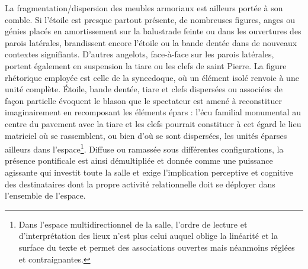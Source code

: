\documentclass[12pt,twoside,openany]{book}
\begin{document}
La fragmentation/dispersion des meubles armoriaux est ailleurs portée à son comble. Si l’étoile est presque partout présente, de nombreuses figures, anges ou génies placés en amortissement sur la balustrade feinte ou dans les ouvertures des parois latérales, brandissent encore l’étoile ou la bande dentée dans de nouveaux contextes signifiants. D’autres angelots, face-à-face sur les parois latérales, portent également en suspension la tiare ou les clefs de saint Pierre. La figure rhétorique employée est celle de la synecdoque, où un élément isolé renvoie à une unité complète. Étoile, bande dentée, tiare et clefs dispersées ou associées de façon partielle évoquent le blason que le spectateur est amené à reconstituer imaginairement en recomposant les éléments épars : l’écu familial monumental au centre du pavement avec la tiare et les clefs pourrait constituer à cet égard le lieu matriciel où se rassemblent, ou bien d’où se sont dispersées, les unités éparses ailleurs dans l’espace\footnote{Dans l’espace multidirectionnel de la salle, l’ordre de lecture et d’interprétation des lieux n’est plus celui auquel oblige la linéarité et la surface du texte et permet des associations ouvertes mais néanmoins réglées et contraignantes.}. Diffuse ou ramassée sous différentes configurations, la présence pontificale est ainsi démultipliée et donnée comme une puissance agissante qui investit toute la salle et exige l’implication perceptive et cognitive des destinataires dont la propre activité relationnelle doit se déployer dans l’ensemble de l’espace.
\end{document}
